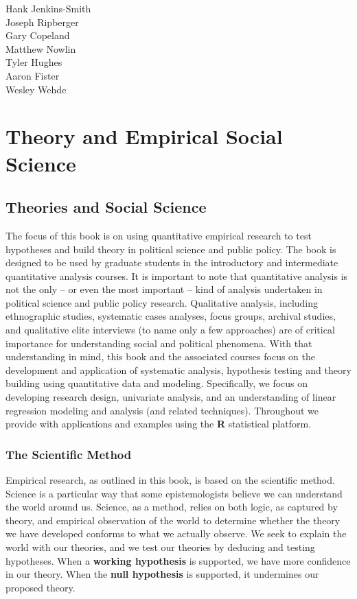 \documentclass[11pt,openany]{book}\usepackage[]{graphicx}\usepackage[]{color}
\begin{document}
\noindent Hank Jenkins-Smith\\
Joseph Ripberger\\
Gary Copeland\\
Matthew Nowlin\\
Tyler Hughes\\
Aaron Fister\\
Wesley Wehde\\



\doublespace 
\part{Theory and Empirical Social Science} 




\chapter{Theories and Social Science}

The focus of this book is on using quantitative empirical research to test hypotheses and build theory in political science and public policy. The book is designed to be used by graduate students in the introductory and intermediate quantitative analysis courses. It is important to note that quantitative analysis is not the only -- or even the most important -- kind of analysis undertaken in political science and public policy research. Qualitative analysis, including ethnographic studies, systematic cases analyses, focus groups, archival studies, and qualitative elite interviews (to name only a few approaches) are of critical importance for understanding social and political phenomena. With that understanding in mind, this book and the associated courses focus on  the development and application of systematic analysis, hypothesis testing and theory building using quantitative data and modeling. Specifically, we focus on developing research design, univariate analysis, and an understanding of linear regression modeling and analysis (and related techniques). Throughout we provide with applications and examples using the \textbf{R} statistical platform. 


\section{The Scientific Method}

Empirical research, as outlined in this book, is based on the scientific method. Science is a particular way that some  epistemologists believe we can understand the world around us. Science, as a method, relies on both logic, as  captured by theory, and empirical observation of the world to determine whether the theory we have developed  conforms to what we actually observe. We seek to explain the world with our theories, and we test our theories by  deducing and testing hypotheses. When a \textbf{working hypothesis} is supported, we have more confidence in our theory. When the \textbf{null hypothesis} is supported, it undermines our proposed theory.
\end{document}
